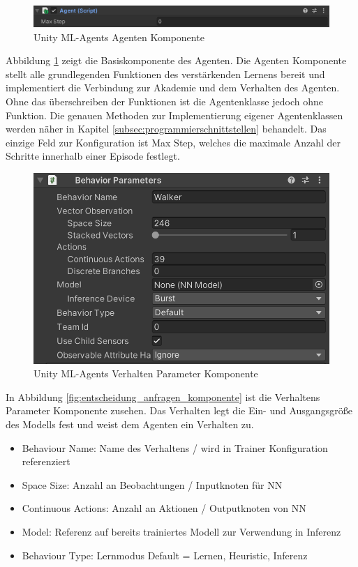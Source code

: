 \begin{figure}[H]
  \centering
  \includegraphics[scale=0.5]{img/agent_komponente}
  \caption{Unity ML-Agents Agenten Komponente}
  \label{fig:agent_komponente}
\end{figure}

Abbildung \ref{fig:agent_komponente} zeigt die Basiskomponente des Agenten. Die Agenten Komponente stellt alle grundlegenden Funktionen des verstärkenden Lernens bereit und implementiert die Verbindung zur Akademie und dem Verhalten des Agenten. Ohne das überschreiben der Funktionen ist die Agentenklasse jedoch ohne Funktion. Die genauen Methoden zur Implementierung eigener Agentenklassen werden näher in Kapitel \ref{subsec:programmierschnittstellen} behandelt. Das einzige Feld zur Konfiguration ist Max Step, welches die maximale Anzahl der Schritte innerhalb einer Episode festlegt.

\begin{figure}[H]
  \centering  
  \includegraphics[scale=0.5]{img/verhalten_komponente.png}
  \caption{Unity ML-Agents Verhalten Parameter Komponente}
  \label{fig:verhalten_komponente}
\end{figure}

In Abbildung \ref{fig:entscheidung_anfragen_komponente} ist die Verhaltens Parameter Komponente zusehen. Das Verhalten legt die Ein- und Ausgangsgröße des Modells fest und weist dem Agenten ein Verhalten zu.
\begin{itemize}
  \item Behaviour Name: Name des Verhaltens / wird in Trainer Konfiguration referenziert
  \item Space Size: Anzahl an Beobachtungen / Inputknoten für NN
  \item Continuous Actions: Anzahl an Aktionen / Outputknoten von NN
  \item Model: Referenz auf bereits trainiertes Modell zur Verwendung in Inferenz
  \item Behaviour Type: Lernmodus Default = Lernen, Heuristic, Inferenz
\end{itemize}


